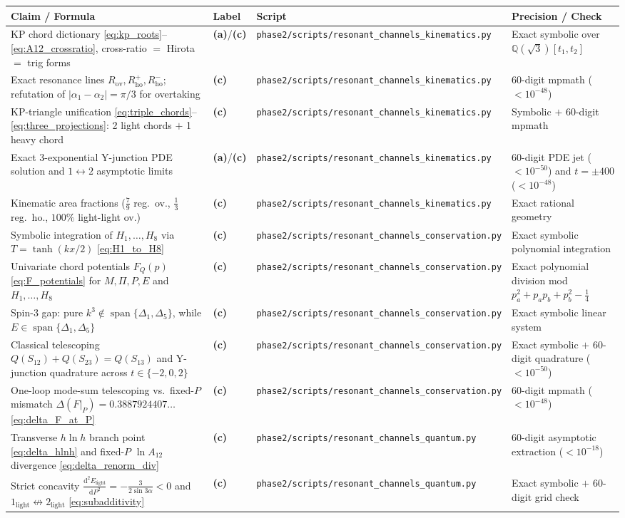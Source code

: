 \documentclass[11pt,a4paper]{article}
\newcommand{\La}{\textsf{\textbf{(a)}}\xspace}
\newcommand{\Lc}{\textsf{\textbf{(c)}}\xspace}
\newcommand{\dd}{\mathrm{d}}
\newcommand{\skin}{\texttt{phase2/\allowbreak scripts/\allowbreak resonant\_\allowbreak channels\_\allowbreak kinematics.py}}
\newcommand{\scons}{\texttt{phase2/\allowbreak scripts/\allowbreak resonant\_\allowbreak channels\_\allowbreak conservation.py}}
\newcommand{\squant}{\texttt{phase2/\allowbreak scripts/\allowbreak resonant\_\allowbreak channels\_\allowbreak quantum.py}}
\theoremstyle{remark}
\begin{document}
\small
\begin{longtable}{@{}L{4.8cm}L{1.2cm}L{4.3cm}L{4.2cm}@{}}\toprule
Claim / Formula & Label & Script & Precision / Check \\\midrule\endhead
KP chord dictionary \eqref{eq:kp_roots}--\eqref{eq:A12_crossratio}, cross-ratio $=$ Hirota $=$ trig forms & \La/\Lc & \skin & Exact symbolic over $\mathbb{Q}(\sqrt{3})[t_1,t_2]$ \\
Exact resonance lines $R_{\mathrm{ov}},R_{\mathrm{ho}}^+,R_{\mathrm{ho}}^-$; refutation of $|\alpha_1-\alpha_2|=\pi/3$ for overtaking & \Lc & \skin & 60-digit mpmath ($<10^{-48}$) \\
KP-triangle unification \eqref{eq:triple_chords}--\eqref{eq:three_projections}: 2 light chords $+$ 1 heavy chord & \Lc & \skin & Symbolic $+$ 60-digit mpmath \\
Exact 3-exponential Y-junction PDE solution and $1\leftrightarrow 2$ asymptotic limits & \La/\Lc & \skin & 60-digit PDE jet ($<10^{-50}$) and $t=\pm 400$ ($<10^{-48}$) \\
Kinematic area fractions ($\frac{7}{9}$ reg.\ ov., $\frac{1}{3}$ reg.\ ho., $100\%$ light-light ov.) & \Lc & \skin & Exact rational geometry \\
Symbolic integration of $H_1,\dots,H_8$ via $T=\tanh(kx/2)$ \eqref{eq:H1_to_H8} & \Lc & \scons & Exact symbolic polynomial integration \\
Univariate chord potentials $F_Q(p)$ \eqref{eq:F_potentials} for $M,\Pi,P,E$ and $H_1,\dots,H_8$ & \Lc & \scons & Exact polynomial division mod $p_a^2+p_a p_b+p_b^2-\frac{1}{4}$ \\
Spin-3 gap: pure $k^3 \notin \operatorname{span}\{\Delta_1,\Delta_5\}$, while $E\in\operatorname{span}\{\Delta_1,\Delta_5\}$ & \Lc & \scons & Exact symbolic linear system \\
Classical telescoping $Q(S_{12})+Q(S_{23})=Q(S_{13})$ and Y-junction quadrature across $t\in\{-2,0,2\}$ & \Lc & \scons & Exact symbolic $+$ 60-digit quadrature ($<10^{-50}$) \\
One-loop mode-sum telescoping vs.\ fixed-$P$ mismatch $\Delta(F|_P)=0.3887924407\ldots$ \eqref{eq:delta_F_at_P} & \Lc & \scons & 60-digit mpmath ($<10^{-48}$) \\
Transverse $h\ln h$ branch point \eqref{eq:delta_hlnh} and fixed-$P$ $\ln A_{12}$ divergence \eqref{eq:delta_renorm_div} & \Lc & \squant & 60-digit asymptotic extraction ($<10^{-18}$) \\
Strict concavity $\frac{\dd^2 E_{\mathrm{light}}}{\dd P^2}=-\frac{3}{2\sin 3\alpha}<0$ and $1_{\mathrm{light}}\not\leftrightarrow 2_{\mathrm{light}}$ \eqref{eq:subadditivity} & \Lc & \squant & Exact symbolic $+$ 60-digit grid check \\

\end{longtable}
\end{document}
